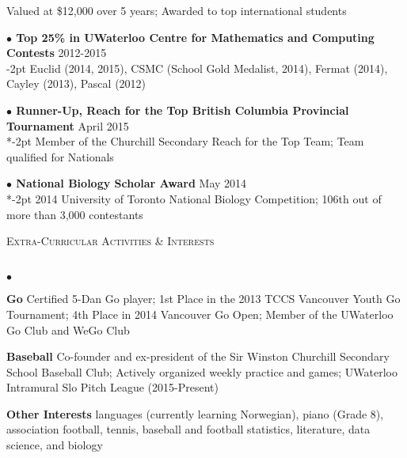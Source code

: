 \documentclass{article}
\newcommand{\lineunder}{\vspace*{-8pt} \\ \hspace*{-18pt} \hrulefill \\}
\newcommand{\header}[1]{{\hspace*{-15pt}\vspace*{6pt} \textsc{#1}} \vspace*{-6pt} \lineunder}
\newenvironment{achievements}{\begin{list}{$\bullet$}{\topsep 0pt \itemsep -2pt}}{\vspace*{4pt}\end{list}}
\newcommand{\award}[3]{\hspace{12pt} \textbf{$\bullet$ \hspace{2bp}#1} \hfill{#2} \\ \vspace{2pt}
}
\begin{document}
\vspace{-2pt}
\hspace{22bp}
Valued at \$12,000 over 5 years; Awarded to top international students

\award{Top 25\% in UWaterloo Centre for Mathematics and Computing Contests}{2012-2015}

\vspace{-2pt}
\hspace{22bp}
Euclid (2014, 2015), CSMC (School Gold Medalist, 2014), Fermat (2014), Cayley (2013), Pascal (2012)

\award{Runner-Up, Reach for the Top British Columbia Provincial Tournament}{April 2015}

\vspace*{-2pt}
\hspace{22bp}
Member of the Churchill Secondary Reach for the Top Team; Team qualified for Nationals

\award{National Biology Scholar Award}{May 2014}

\vspace*{-2pt}
\hspace{22bp}
2014 University of Toronto National Biology Competition; 106th out of more than 3,000 contestants

\vspace*{5pt}

\header{Extra-Curricular Activities \& Interests}
\begin{achievements}
\item \textbf{Go} \hspace{3bp}Certified 5-Dan Go player; 1st Place in the 2013 TCCS Vancouver Youth Go Tournament; 4th Place in 2014 Vancouver Go Open; Member of the UWaterloo Go Club and WeGo Club
\item \textbf{Baseball}	\hspace{3bp}Co-founder and ex-president of the Sir Winston Churchill Secondary School Baseball Club; Actively organized weekly practice and games; UWaterloo Intramural Slo Pitch League (2015-Present)
\item \textbf{Other Interests} \hspace{3bp}languages (currently learning Norwegian), piano (Grade 8), association football, tennis, baseball and football statistics, literature, data science, and biology
\end{achievements}
\end{document}
